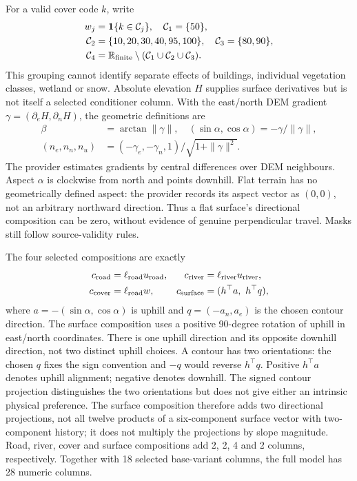 \documentclass[11pt]{article}
\newcommand{\R}{\mathbb{R}}
\begin{document}
For a valid cover code \(k\), write
\begin{equation}
 \begin{aligned}
 w_j&=\mathbf1\{k\in\mathcal C_j\},\quad\mathcal C_1=\{50\},\\
 \mathcal C_2&=\{10,20,30,40,95,100\},\quad\mathcal C_3=\{80,90\},\\
 \mathcal C_4&=\R_{\rm finite}\setminus(\mathcal C_1\cup\mathcal C_2\cup\mathcal C_3).
 \end{aligned}
 \label{eq:cover-indicators}
\end{equation}
This grouping cannot identify separate effects of buildings, individual
vegetation classes, wetland or snow. Absolute elevation \(H\) supplies surface
derivatives but is not itself a selected conditioner column. With the
east/north DEM gradient \(\gamma=(\partial_e H,\partial_n H)\), the geometric
definitions are
\begin{equation}
 \begin{aligned}
 \beta&=\arctan\|\gamma\|,\quad (\sin\alpha,\cos\alpha)=-\gamma/\|\gamma\|,\\
 (n_e,n_n,n_u)&=(-\gamma_e,-\gamma_n,1)/\sqrt{1+\|\gamma\|^2}.
 \end{aligned}
 \label{eq:surface-geometry}
\end{equation}
The provider estimates gradients by central differences over DEM neighbours.
Aspect \(\alpha\) is clockwise from north and points downhill.
Flat terrain has no geometrically defined aspect: the provider records its
aspect vector as \((0,0)\), not an arbitrary northward direction. Thus a flat
surface's directional composition can be zero, without evidence of genuine
perpendicular travel. Masks still follow source-validity rules.

The four selected compositions are exactly
\begin{align}
 c_{\rm road}&=\ell_{\rm road}u_{\rm road},&
 c_{\rm river}&=\ell_{\rm river}u_{\rm river},\notag\\
 c_{\rm cover}&=\ell_{\rm road}w,&
 c_{\rm surface}&=(h^\top a,\ h^\top q),
 \label{eq:feature-compositions}
\end{align}
where \(a=-(\sin\alpha,\cos\alpha)\) is uphill and
\(q=(-a_n,a_e)\) is the chosen contour direction. The surface composition
uses a positive 90-degree rotation of uphill in east/north coordinates.
There is one uphill direction and its opposite downhill direction, not two
distinct uphill choices. A contour has two orientations: the chosen \(q\)
fixes the sign convention and \(-q\) would reverse \(h^\top q\).
Positive \(h^\top a\) denotes uphill alignment; negative denotes downhill.
The signed contour projection distinguishes the two orientations but does
not give either an intrinsic physical preference. The surface composition
therefore adds two directional projections, not all twelve products of a
six-component surface vector with two-component history; it does not multiply
the projections by slope magnitude. Road, river, cover and surface
compositions add 2, 2, 4 and 2 columns, respectively. Together with 18 selected
base-variant columns, the full model has 28 numeric columns.
\end{document}

